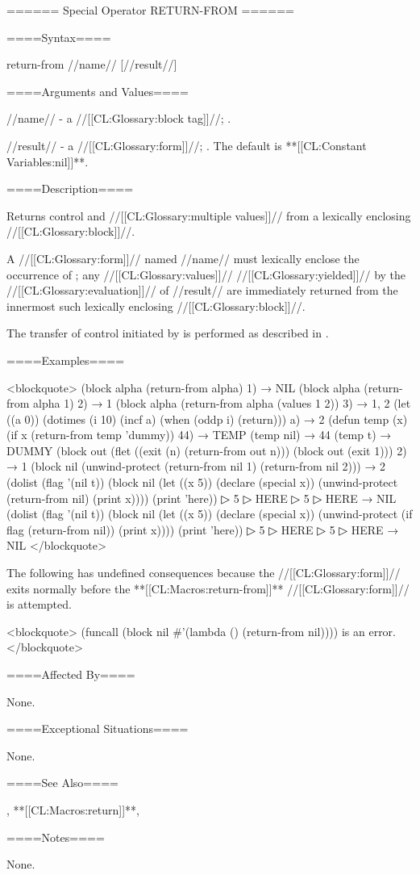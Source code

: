 ====== Special Operator RETURN-FROM ======

====Syntax====

\DefspecNoReturn return-from {//name// [//result//]}

====Arguments and Values====

//name// - a //[[CL:Glossary:block tag]]//; \noeval.

//result// - a //[[CL:Glossary:form]]//; \eval. The default is **[[CL:Constant Variables:nil]]**.

====Description====

Returns control and //[[CL:Glossary:multiple values]]// from a lexically enclosing //[[CL:Glossary:block]]//.

A  //[[CL:Glossary:form]]// named //name// must lexically enclose the occurrence of ; any //[[CL:Glossary:values]]// //[[CL:Glossary:yielded]]// by the //[[CL:Glossary:evaluation]]// of //result// are immediately returned from the innermost such lexically enclosing //[[CL:Glossary:block]]//.

The transfer of control initiated by  is performed as described in \secref\TransferOfControl.

====Examples====

<blockquote> (block alpha (return-from alpha) 1) → NIL (block alpha (return-from alpha 1) 2) → 1 (block alpha (return-from alpha (values 1 2)) 3) → 1, 2 (let ((a 0)) (dotimes (i 10) (incf a) (when (oddp i) (return))) a) → 2 (defun temp (x) (if x (return-from temp 'dummy)) 44) → TEMP (temp nil) → 44 (temp t) → DUMMY (block out (flet ((exit (n) (return-from out n))) (block out (exit 1))) 2) → 1 (block nil (unwind-protect (return-from nil 1) (return-from nil 2))) → 2 (dolist (flag '(nil t)) (block nil (let ((x 5)) (declare (special x)) (unwind-protect (return-from nil) (print x)))) (print 'here))
▷ 5
▷ HERE
▷ 5
▷ HERE → NIL (dolist (flag '(nil t)) (block nil (let ((x 5)) (declare (special x)) (unwind-protect (if flag (return-from nil)) (print x)))) (print 'here))
▷ 5
▷ HERE
▷ 5
▷ HERE → NIL </blockquote>

The following has undefined consequences because the  //[[CL:Glossary:form]]// exits normally before the **[[CL:Macros:return-from]]** //[[CL:Glossary:form]]// is attempted.

<blockquote> (funcall (block nil #'(lambda () (return-from nil)))) is an error. </blockquote>

====Affected By====

None.

====Exceptional Situations====

None.

====See Also====

, **[[CL:Macros:return]]**, {\secref\Evaluation}

====Notes====

None.


